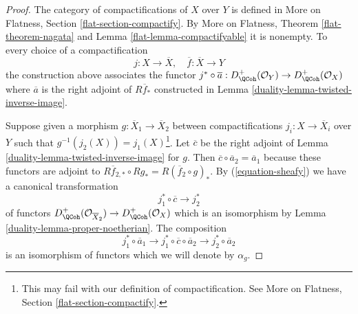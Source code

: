 \begin{proof}

The category of compactifications of $X$ over $Y$ is defined
in More on Flatness, Section \ref{flat-section-compactify}.
By More on Flatness, Theorem \ref{flat-theorem-nagata} and
Lemma \ref{flat-lemma-compactifyable} it is nonempty.
To every choice of a compactification
$$
j : X \to \overline{X},\quad \overline{f} : \overline{X} \to Y
$$
the construction above associates the functor $j^* \circ \overline{a} :
D_\QCoh^+(\mathcal{O}_Y) \to D_\QCoh^+(\mathcal{O}_X)$
where $\overline{a}$ is the right adjoint of $R\overline{f}_*$
constructed in Lemma \ref{duality-lemma-twisted-inverse-image}.

\medskip\noindent
Suppose given a morphism $g : \overline{X}_1 \to \overline{X}_2$
between compactifications $j_i : X \to \overline{X}_i$ over $Y$
such that $g^{-1}(j_2(X)) = j_1(X)$\footnote{This may fail
with our definition of compactification. See
More on Flatness, Section \ref{flat-section-compactify}.}.
Let $\overline{c}$ be the right adjoint of
Lemma \ref{duality-lemma-twisted-inverse-image} for $g$.
Then $\overline{c} \circ \overline{a}_2 = \overline{a}_1$
because these functors are adjoint to
$R\overline{f}_{2, *} \circ Rg_* = R(\overline{f}_2 \circ g)_*$.
By (\ref{equation-sheafy}) we have a canonical transformation
$$
j_1^* \circ \overline{c} \longrightarrow j_2^*
$$
of functors
$D^+_\QCoh(\mathcal{O}_{\overline{X}_2}) \to D^+_\QCoh(\mathcal{O}_X)$
which is an isomorphism by Lemma \ref{duality-lemma-proper-noetherian}.
The composition
$$
j_1^* \circ \overline{a}_1 \longrightarrow
j_1^* \circ \overline{c} \circ \overline{a}_2 \longrightarrow
j_2^* \circ \overline{a}_2
$$
is an isomorphism of functors which we will denote by $\alpha_g$.


\end{proof}
